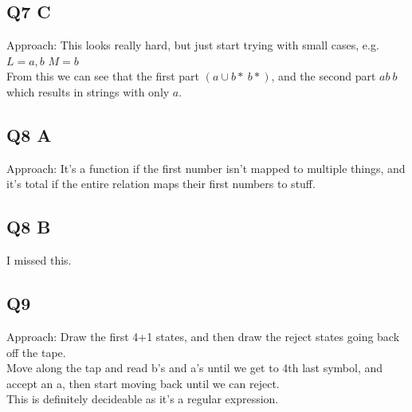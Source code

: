 \documentclass[12pt]{article}
\begin{document}
\subsection*{Q7 C}

Approach: This looks really hard, but just start trying with small cases, e.g.\\
$L = {a,b}$
$M = {b}$\\
From this we can see that the first part $(a\cup b* \ b*)$, and the second part ${ab \ b}$ which results in strings with only $a$.

\subsection*{Q8 A}

Approach: It’s a function if the first number isn’t mapped to multiple things, and it’s total if the entire relation maps their first numbers to stuff.

\subsection*{Q8 B}

I missed this.

\subsection*{Q9}

Approach: Draw the first 4+1 states, and then draw the reject states going back off the tape.\\
Move along the tap and read b's and a's until we get to 4th last symbol, and accept an a, then start moving back until we can reject.\\
This is definitely decideable as it's a regular expression.\\
\end{document}
